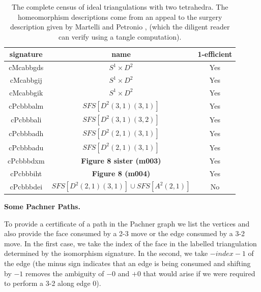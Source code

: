 \documentclass[12pt,reqno]{amsart}  %
\theoremstyle{definition}
\theoremstyle{remark}
\begin{document}
\begin{table}[ht]
\begin{tabular}{|c|c|c|}
\hline
signature & name & 1-efficient\\
\hline
\hline
cMcabbgds & {\bf $S^1\times D^2$} & Yes\\
\hline
cMcabbgij &$S^1\times D^2$ & Yes\\
\hline
cMcabbgik &$S^1\times D^2$ & Yes\\
\hline
\hline
cPcbbbalm &{\bf $SFS[D^2(3,1)(3,1)]$} & Yes\\
\hline
\hline
cPcbbbali &{\bf $SFS[D^2(3,1)(3,2)]$} & Yes\\
\hline
\hline

cPcbbbadh &{\bf $SFS[D^2(2,1)(3,1)]$} & Yes\\
\hline
cPcbbbadu &{\bf $SFS[D^2(2,1)(3,1)]$} & Yes\\
\hline
\hline
cPcbbbdxm& {\bf Figure 8 sister (m003)} & Yes\\
\hline
\hline
cPcbbbiht &{\bf Figure 8 (m004)} & Yes\\
\hline
\hline
cPcbbbdei &{\bf $SFS[D^2(2,1)(3,1)] \cup SFS[A^2(2,1)]$} & No \\
\hline

\end{tabular}
\caption{\label{tab:twoTetCensus} The complete census of ideal 
triangulations with two tetrahedra. The homeomorphism descriptions come 
from an appeal to the surgery description given by Martelli and Petronio 
\cite{MP},  (which the diligent reader can verify using a tangle computation). 
}
\end{table}

\break
\noindent
{\bf Some Pachner Paths.} 

To provide a certificate of a path in the Pachner graph we list the 
vertices and also provide the face consumed by a 2-3 move or the edge 
consumed by a 3-2 move. In the first case, we take the index of the face 
in the labelled triangulation determined by the isomorphism signature. 
In the second, we take $-index -1$ of the edge (the minus sign indicates 
that an edge is being consumed and shifting by $-1$ removes the ambiguity 
of $-0$ and $+0$ that would arise if we were required to perform a 3-2 
along edge 0). 
\end{document}
